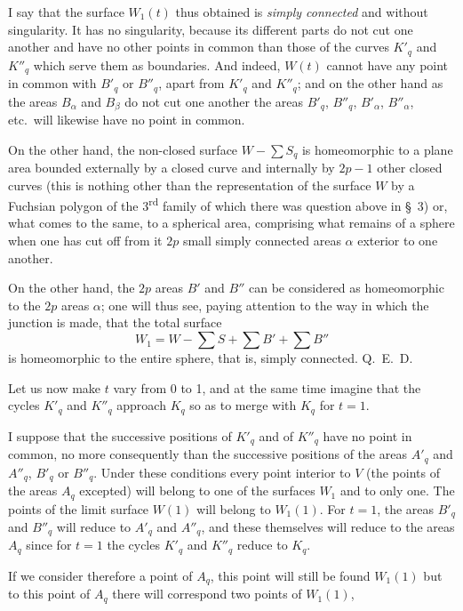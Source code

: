 \documentclass{article}
\begin{document}
I say that the surface $W_{1}(t)$ thus obtained is \emph{simply connected} and without singularity. It has no singularity, because its different parts do not cut one another and have no other points in common than those of the curves $K'_{q}$ and $K''_{q}$ which serve them as boundaries. And indeed, $W(t)$ cannot have any point in common with $B'_{q}$ or $B''_{q}$, apart from $K'_{q}$ and $K''_{q}$; and on the other hand as the areas $B_{\alpha}$ and $B_{\beta}$ do not cut one another the areas $B'_{q}$, $B''_{q}$, $B'_{\alpha}$, $B''_{\alpha}$, etc.\ will likewise have no point in common.

On the other hand, the non-closed surface $W - \displaystyle\sum S_{q}$ is homeomorphic to a plane area bounded externally by a closed curve and internally by $2p - 1$ other closed curves (this is nothing other than the representation of the surface $W$ by a Fuchsian polygon of the 3\textsuperscript{rd} family of which there was question above in \S~3) or, what comes to the same, to a spherical area, comprising what remains of a sphere when one has cut off from it $2p$ small simply connected areas $\alpha$ exterior to one another.

On the other hand, the $2p$ areas $B'$ and $B''$ can be considered as homeomorphic to the $2p$ areas $\alpha$; one will thus see, paying attention to the way in which the junction is made, that the total surface
\[ W_{1} = W - \sum S + \sum B' + \sum B'' \]
is homeomorphic to the entire sphere, that is, simply connected. Q.~E.~D.

Let us now make $t$ vary from 0 to 1, and at the same time imagine that the cycles $K'_{q}$ and $K''_{q}$ approach $K_{q}$ so as to merge with $K_{q}$ for $t = 1$.

I suppose that the successive positions of $K'_{q}$ and of $K''_{q}$ have no point in common, no more consequently than the successive positions of the areas $A'_{q}$ and $A''_{q}$, $B'_{q}$ or $B''_{q}$. Under these conditions every point interior to $V$ (the points of the areas $A_{q}$ excepted) will belong to one of the surfaces $W_{1}$ and to only one. The points of the limit surface $W(1)$ will belong to $W_{1}(1)$. For $t = 1$, the areas $B'_{q}$ and $B''_{q}$ will reduce to $A'_{q}$ and $A''_{q}$, and these themselves will reduce to the areas $A_{q}$ since for $t = 1$ the cycles $K'_{q}$ and $K''_{q}$ reduce to $K_{q}$.

If we consider therefore a point of $A_{q}$, this point will still be found $W_{1}(1)$ but to this point of $A_{q}$ there will correspond two points of $W_{1}(1)$,
\end{document}

